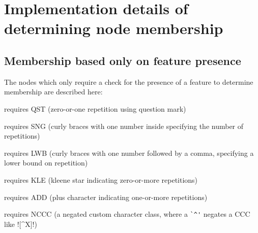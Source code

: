 \section{Implementation details of determining node membership}

\subsection{Membership based only on feature presence}
The nodes which only require a check for the presence of a feature to determine membership are described here:
\begin{description} \itemsep -1pt
\item[D2] requires QST (zero-or-one repetition using question mark)
\item[S1] requires SNG (curly braces with one number inside specifying the number of repetitions)
\item[L1] requires LWB (curly braces with one number followed by a comma, specifying a lower bound on repetition)
\item[L2] requires KLE (kleene star indicating zero-or-more repetitions)
\item[L3] requires ADD (plus character indicating one-or-more repetitions)
\item[C3] requires NCCC (a negated custom character class, where a \verb!`^'! negates a CCC like \cverb![^X]!)
\end{description}

